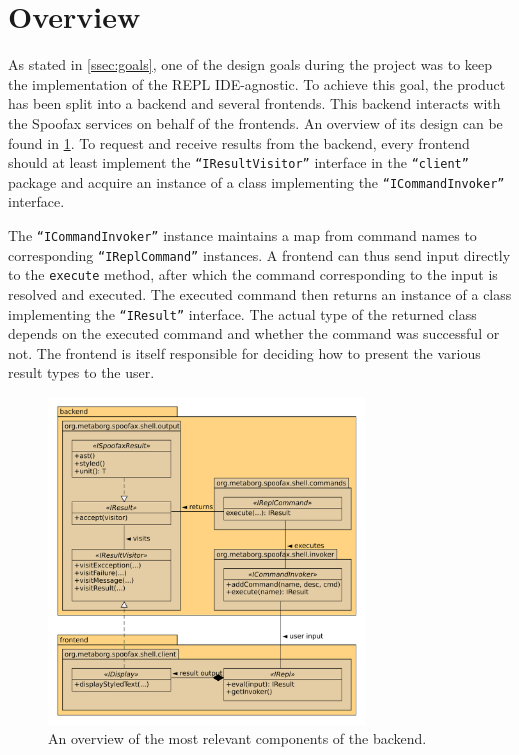 \section{Overview}
\label{sec:overview}

As stated in \cref{ssec:goals}, one of the design goals during the project was
to keep the implementation of the REPL IDE-agnostic. To achieve this goal, the
product has been split into a backend and several frontends. This backend
interacts with the Spoofax services on behalf of the frontends. An overview of
its design can be found in \cref{fig:uml-overview}. To request and receive
results from the backend, every frontend should at least implement the
\texttt{``IResultVisitor''} interface in the \texttt{``client''} package and
acquire an instance of a class implementing the \texttt{``ICommandInvoker''}
interface.

The \texttt{``ICommandInvoker''} instance maintains a map from command names to
corresponding \texttt{``IReplCommand''} instances. A frontend can thus send
input directly to the \texttt{execute} method, after which the command
corresponding to the input is resolved and executed. The executed command
then returns an instance of a class implementing the \texttt{``IResult''}
interface. The actual type of the returned class depends on the executed command
and whether the command was successful or not. The frontend is itself
responsible for deciding how to present the various result types to the user.

\begin{figure}[h!]
  \centering
  \includegraphics[width=0.75\textwidth]{uml-overview}
  \caption{An overview of the most relevant components of the backend.}
  \label{fig:uml-overview}
\end{figure}
